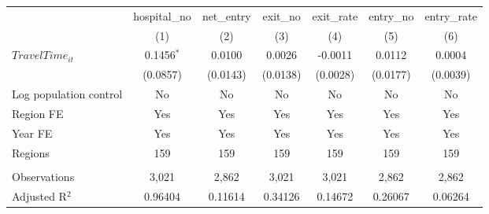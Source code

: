 \begingroup
\centering
\begin{tabular}{lcccccc}
   \toprule
                          & hospital\_no  & net\_entry  & exit\_no  & exit\_rate  & entry\_no  & entry\_rate \\    
                          & (1)           & (2)         & (3)       & (4)         & (5)        & (6)\\  
   \midrule 
   $TravelTime_{it}$      & 0.1456$^{*}$  & 0.0100      & 0.0026    & -0.0011     & 0.0112     & 0.0004\\   
                          & (0.0857)      & (0.0143)    & (0.0138)  & (0.0028)    & (0.0177)   & (0.0039)\\   
   Log population control & No            & No          & No        & No          & No         & No\\  
   Region FE              & Yes           & Yes         & Yes       & Yes         & Yes        & Yes\\  
   Year FE                & Yes           & Yes         & Yes       & Yes         & Yes        & Yes\\  
   Regions                & 159           & 159         & 159       & 159         & 159        & 159\\  
    \\
   Observations           & 3,021         & 2,862       & 3,021     & 3,021       & 2,862      & 2,862\\  
   Adjusted R$^2$         & 0.96404       & 0.11614     & 0.34126   & 0.14672     & 0.26067    & 0.06264\\  
   \bottomrule
\end{tabular}
\par\endgroup

